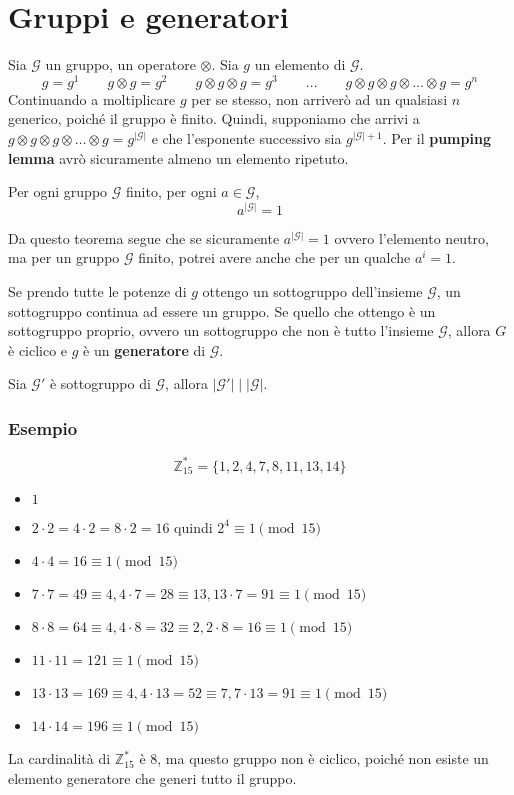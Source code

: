 \section{Gruppi e generatori}
Sia $\mathcal{G}$ un gruppo, un operatore $\otimes$. Sia $g$ un elemento di $\mathcal{G}$.
\[
  g = g^1 \qquad g \otimes g = g^2 \qquad g \otimes g \otimes g = g^3 \qquad \dots \qquad g \otimes g 
  \otimes g \otimes \dots \otimes g = g^n
\]
Continuando a moltiplicare $g$ per se stesso, non arriverò ad un qualsiasi $n$ generico, poiché 
il gruppo è finito. Quindi, supponiamo  che arrivi a $g \otimes g 
\otimes g \otimes \dots \otimes g = g^{\lvert \mathcal{G} \rvert}$ e che l'esponente successivo 
sia $g^{\lvert \mathcal{G} \rvert + 1}$. Per il \textbf{pumping lemma} avrò sicuramente 
almeno un elemento ripetuto.
\begin{theorem}
  Per ogni gruppo $\mathcal{G}$ finito, per ogni $a \in \mathcal{G}$, 
  \[
    a^{\lvert \mathcal{G} \rvert} = 1
  \]
\end{theorem}
Da questo teorema segue che se sicuramente $a^{\lvert \mathcal{G} \rvert} = 1$ ovvero l'elemento neutro,
ma per un gruppo $\mathcal{G}$ finito, potrei avere anche che per un qualche
$a^i = 1$.

Se prendo tutte le potenze di $g$ ottengo un sottogruppo dell'insieme $\mathcal{G}$, un sottogruppo 
continua ad essere un gruppo. Se quello che ottengo è un sottogruppo proprio, ovvero 
un sottogruppo che non è tutto l'insieme $\mathcal{G}$, allora $G$ è ciclico e $g$ è un 
\textbf{generatore} di $\mathcal{G}$.
\begin{theorem}
  Sia $\mathcal{G}'$ è sottogruppo di $\mathcal{G}$, allora $\lvert \mathcal{G}' \rvert \mid
  \lvert \mathcal{G} \rvert$.
\end{theorem}
\subsubsection{Esempio}
\[
  \mathbb{Z}_{15}^* = \{1,2,4,7,8,11,13,14\}
\]
\begin{itemize}
  \item $1$
  \item $2 \cdot 2 = 4 \cdot 2 = 8 \cdot 2 = 16$ quindi $2^4 \equiv 1 \pmod{15}$
  \item $4 \cdot 4 = 16 \equiv 1 \pmod{15}$
  \item $7 \cdot 7 = 49 \equiv 4, 4 \cdot 7 = 28 \equiv 13, 13 \cdot 7 = 91 \equiv 1 \pmod{15}$
  \item $8 \cdot 8 = 64 \equiv 4, 4 \cdot 8 = 32 \equiv 2, 2 \cdot 8 = 16 \equiv 1 \pmod{15}$
  \item $11 \cdot 11 = 121 \equiv 1 \pmod{15}$
  \item $13 \cdot 13 = 169 \equiv 4, 4 \cdot 13 = 52 \equiv 7, 7 \cdot 13 = 91 \equiv 1 \pmod{15}$
  \item $14 \cdot 14 = 196 \equiv 1 \pmod{15}$
\end{itemize}
La cardinalità di $\mathbb{Z}_{15}^*$ è $8$, ma questo gruppo non è ciclico, poiché non esiste un
elemento generatore che generi tutto il gruppo.
